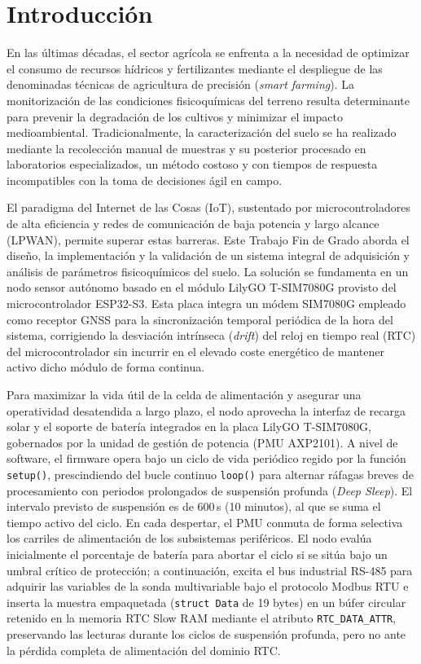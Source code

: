 
\section{Introducción}
En las últimas décadas, el sector agrícola se enfrenta a la necesidad de optimizar el consumo de 
recursos hídricos y fertilizantes mediante el despliegue de las denominadas técnicas de agricultura de 
precisión (\textit{smart farming}). La monitorización de las condiciones fisicoquímicas del terreno resulta 
determinante para prevenir la degradación de los cultivos y minimizar el impacto medioambiental. Tradicionalmente, 
la caracterización del suelo se ha realizado mediante la recolección manual de muestras y su posterior procesado en 
laboratorios especializados, un método costoso y con tiempos de respuesta incompatibles con la toma de decisiones ágil en campo.

El paradigma del Internet de las Cosas (IoT), sustentado por microcontroladores de alta eficiencia 
y redes de comunicación de baja potencia y largo alcance (LPWAN), permite superar estas barreras. 
Este Trabajo Fin de Grado aborda el diseño, la implementación y la validación de un sistema integral de adquisición 
y análisis de parámetros fisicoquímicos del suelo. La solución se fundamenta en un nodo sensor autónomo basado en el 
módulo LilyGO T-SIM7080G provisto del microcontrolador ESP32-S3. Esta placa integra un módem SIM7080G empleado como receptor 
GNSS para la sincronización temporal periódica de la hora del sistema, corrigiendo la desviación intrínseca (\textit{drift}) 
del reloj en tiempo real (RTC) del microcontrolador sin incurrir en el elevado coste energético de mantener activo dicho módulo de forma continua.

Para maximizar la vida útil de la celda de alimentación y asegurar una operatividad 
desatendida a largo plazo, el nodo aprovecha la interfaz de recarga solar y el soporte 
de batería integrados en la placa LilyGO T-SIM7080G, gobernados por la unidad de gestión 
de potencia (PMU AXP2101). A nivel de software, el firmware opera bajo un ciclo de vida 
periódico regido por la función \texttt{setup()}, prescindiendo del bucle continuo 
\texttt{loop()} para alternar ráfagas breves de procesamiento con periodos prolongados 
de suspensión profunda (\textit{Deep Sleep}). El intervalo previsto de suspensión es de 600\,s (10 minutos), al que se suma el tiempo activo del ciclo. En cada despertar, el PMU conmuta de
forma selectiva los carriles de alimentación de los subsistemas periféricos. El nodo 
evalúa inicialmente el porcentaje de batería para abortar el ciclo si se sitúa bajo un
umbral crítico de protección; a continuación, excita el bus industrial RS-485 para 
adquirir las variables de la sonda multivariable bajo el protocolo Modbus RTU e inserta 
la muestra empaquetada (\texttt{struct Data} de 19 bytes) en un búfer circular retenido 
en la memoria RTC Slow RAM mediante el atributo \texttt{RTC\_DATA\_ATTR}, preservando 
las lecturas durante los ciclos de suspensión profunda, pero no ante la pérdida completa de alimentación del dominio RTC.

